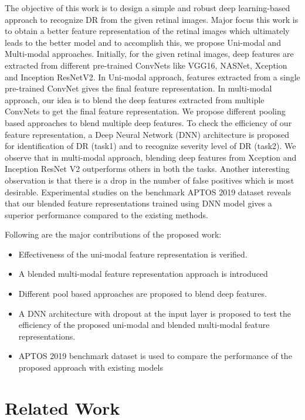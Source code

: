 \documentclass[electronics,article,accept ,moreauthors,pdftex]{mdpi}
\begin{document}
The objective of this work is to design a simple and robust deep learning-based approach to recognize DR from the given retinal images.
Major focus this work is to obtain a better feature representation of the retinal images which ultimately leads to the better model and to accomplish this, we propose  Uni-modal and Multi-modal approaches. Initially, for the given retinal images, deep features are extracted from different pre-trained ConvNets like VGG16, NASNet, Xception and Inception ResNetV2. In Uni-modal approach, features  extracted from a single pre-trained ConvNet gives the final feature representation. In multi-modal approach, our idea is to blend the deep features extracted from multiple ConvNets to get  the final feature representation. We propose different pooling based approaches to blend multiple deep features. 
To check the efficiency of our feature representation, a Deep Neural Network (DNN) architecture is proposed for identification of DR (task1) and to recognize severity level of DR (task2). We observe that in multi-modal approach, blending deep  features from Xception and Inception ResNet V2 outperforms others in both the tasks. Another interesting observation is that there is a drop in the number of false positives which is most desirable. Experimental studies on the benchmark APTOS 2019 dataset reveals that our blended feature representations trained using DNN model gives a superior performance compared to the existing methods.

Following are the major contributions of the proposed work:
\begin{itemize}
\item Effectiveness of the uni-modal feature representation is verified. 
\item A blended multi-modal feature representation approach is introduced 
\item Different pool based approaches are proposed to blend deep features.
\item A DNN architecture with dropout at the input layer is proposed to test the efficiency of the proposed uni-modal and blended multi-modal feature representations.
\item APTOS 2019 benchmark dataset is used to compare the performance of the proposed approach with existing models 
\end{itemize}

\section{Related Work}
\end{document}
